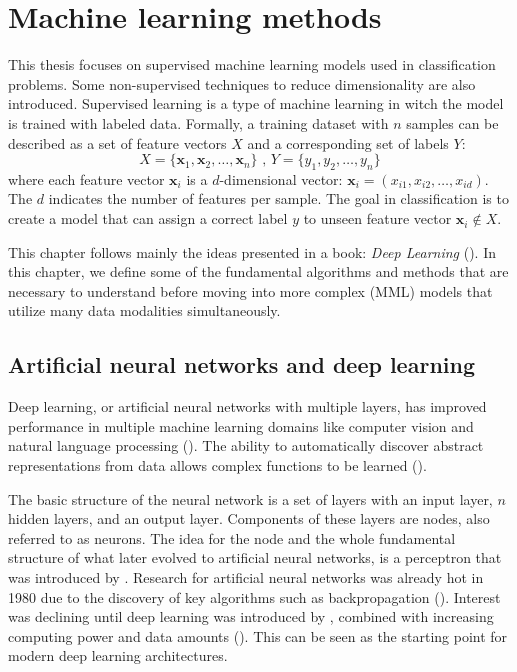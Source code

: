 \chapter{Machine learning methods\label{methods}}

This thesis focuses on supervised machine learning models used in classification problems. Some non-supervised techniques to reduce dimensionality are also introduced. Supervised learning is a type of machine learning in witch the model is trained with labeled data. Formally, a training dataset with $n$ samples can be described as a set of feature vectors $X$ and a corresponding set of labels $Y$: 
\[X = \{ \mathbf{x}_1, \mathbf{x}_2, \ldots, \mathbf{x}_n \} \text{ , } Y = \{ y_1, y_2, \ldots, y_n \}\]
where each feature vector $\mathbf{x}_i$ is a $d$-dimensional vector:
\(\mathbf{x}_i = (x_{i1}, x_{i2}, \ldots, x_{id})\).
The $d$ indicates the number of features per sample. The goal in classification is to create a model that can assign a correct label $y$ to unseen feature vector $\mathbf{x}_i \notin X$.

This chapter follows mainly the ideas presented in a book: \textit{Deep Learning} (\cite{Goodfellow-et-al-2016}). In this chapter, we define some of the fundamental algorithms and methods that are necessary to understand before moving into more complex (MML) models that utilize many data modalities simultaneously. 

\section{Artificial neural networks and deep learning}

Deep learning, or artificial neural networks with multiple layers, has improved performance in multiple machine learning domains like computer vision and natural language processing (\cite{biglecun}). The ability to automatically discover abstract representations from data allows complex functions to be learned (\cite{biglecun}).

The basic structure of the neural network is a set of layers with an input layer, \(n\) hidden layers, and an output layer. Components of these layers are nodes, also referred to as neurons. The idea for the node and the whole fundamental structure of what later evolved to artificial neural networks, is a perceptron that was introduced by \citep{Rosenblatt1958ThePA}. Research for artificial neural networks was already hot in 1980 due to the discovery of key algorithms such as backpropagation (\cite{KARHUNEN2015125}). Interest was declining until deep learning was introduced by \cite{hinton2006fast}, combined with increasing computing power and data amounts (\cite{biglecun}). This can be seen as the starting point for modern deep learning architectures. 

